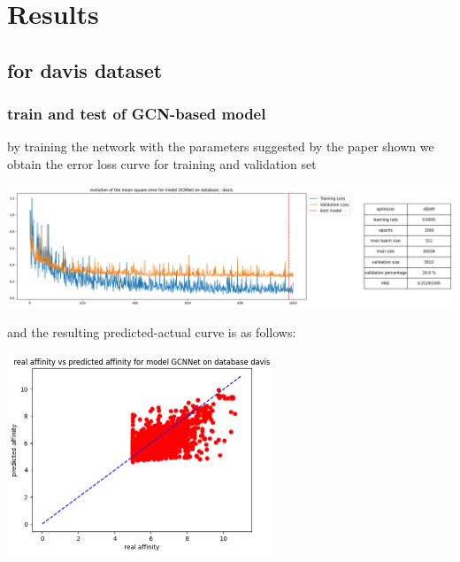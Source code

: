 \documentclass[11pt, a4paper]{article}
\begin{document}
\section{Results}
    \subsection{for davis dataset}
        \subsubsection{train and test of GCN-based model}
        by training the network with the parameters suggested by the paper shown we obtain the error loss curve for training and validation set 
        \begin{center}
            \includegraphics[width=1.0\textwidth]{train_test_plots/davis GCN train.png}
        \end{center}
        and the resulting predicted-actual curve is as follows:
        \begin{center}
            \includegraphics[width=0.6\textwidth]{train_test_plots/davis GCN test.png}
        \end{center}
\end{document}
